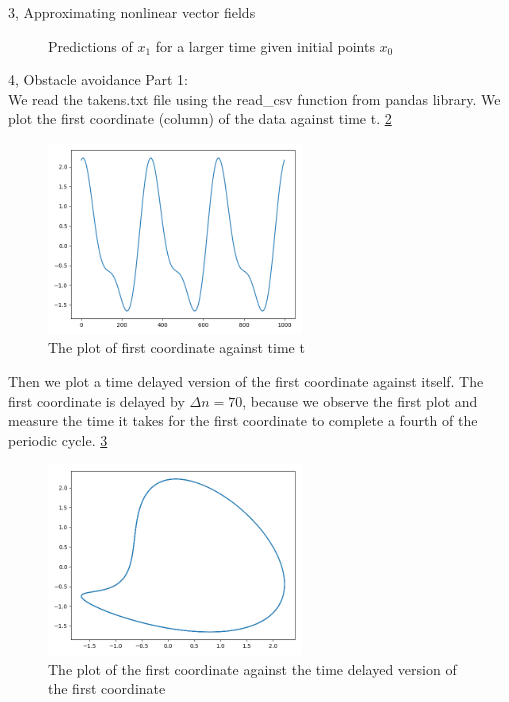\documentclass[10pt,a4paper]{article}
\begin{document}
\begin{task}{3, Approximating nonlinear vector fields}
\begin{figure}[H]
\caption{Predictions of $x_1$ for a larger time given initial points $x_0$}
\label{fig:task3_part3}
\end{figure}

\end{task}

\begin{task}{4, Obstacle avoidance}
Part 1: \\
We read the takens.txt file using the read\_csv function from pandas library. We plot the first coordinate (column) of the data against time t. \ref{fig:task4_part1_1}

\begin{figure}[H]
\centering
\includegraphics[width=0.6\textwidth]{../plots/task4_part1_1.png}
\caption{The plot of first coordinate against time t}
\label{fig:task4_part1_1}
\end{figure}

Then we plot a time delayed version of the first coordinate against itself. The first coordinate is delayed by $\Delta n = 70$, because we observe the first plot and measure the time it takes for the first coordinate to complete a fourth of the periodic cycle. \ref{fig:task4_part1_2}

\begin{figure}[H]
\centering
\includegraphics[width=0.6\textwidth]{../plots/task4_part1_2.png}
\caption{The plot of the first coordinate against the time delayed version of the first coordinate}
\label{fig:task4_part1_2}
\end{figure}


\end{task}
\end{document}
